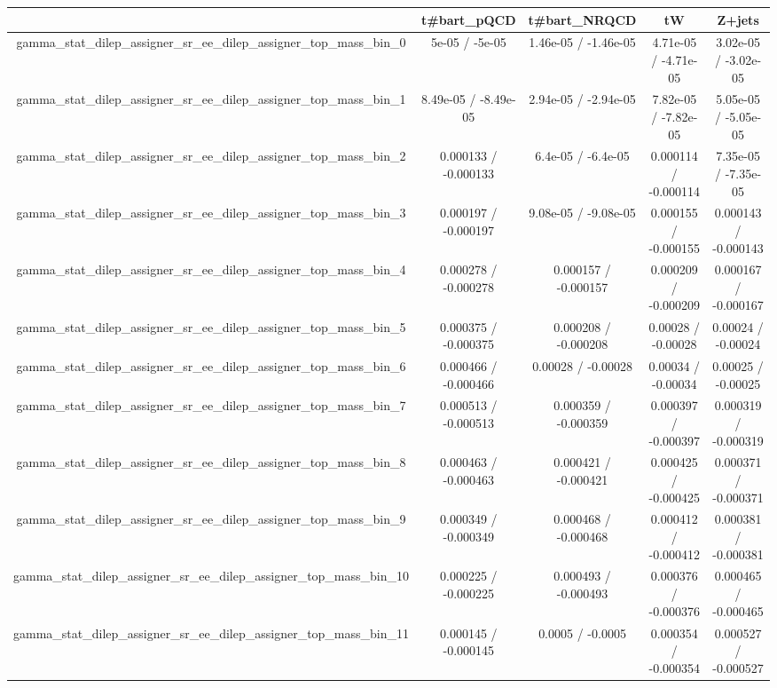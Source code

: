 \documentclass[10pt]{article}
\begin{document}
\begin{table}[htbp]
\begin{center}
\begin{tabular}{|c|c|c|c|c|}
\hline 
      & t#bar{t}_{pQCD}      & t#bar{t}_{NRQCD}      & tW      & Z+jets \\ 
\hline 
  gamma_stat_dilep_assigner_sr_ee_dilep_assigner_top_mass_bin_0 & 5e-05 / -5e-05 & 1.46e-05 / -1.46e-05 & 4.71e-05 / -4.71e-05 & 3.02e-05 / -3.02e-05 \\ 
  gamma_stat_dilep_assigner_sr_ee_dilep_assigner_top_mass_bin_1 & 8.49e-05 / -8.49e-05 & 2.94e-05 / -2.94e-05 & 7.82e-05 / -7.82e-05 & 5.05e-05 / -5.05e-05 \\ 
  gamma_stat_dilep_assigner_sr_ee_dilep_assigner_top_mass_bin_2 & 0.000133 / -0.000133 & 6.4e-05 / -6.4e-05 & 0.000114 / -0.000114 & 7.35e-05 / -7.35e-05 \\ 
  gamma_stat_dilep_assigner_sr_ee_dilep_assigner_top_mass_bin_3 & 0.000197 / -0.000197 & 9.08e-05 / -9.08e-05 & 0.000155 / -0.000155 & 0.000143 / -0.000143 \\ 
  gamma_stat_dilep_assigner_sr_ee_dilep_assigner_top_mass_bin_4 & 0.000278 / -0.000278 & 0.000157 / -0.000157 & 0.000209 / -0.000209 & 0.000167 / -0.000167 \\ 
  gamma_stat_dilep_assigner_sr_ee_dilep_assigner_top_mass_bin_5 & 0.000375 / -0.000375 & 0.000208 / -0.000208 & 0.00028 / -0.00028 & 0.00024 / -0.00024 \\ 
  gamma_stat_dilep_assigner_sr_ee_dilep_assigner_top_mass_bin_6 & 0.000466 / -0.000466 & 0.00028 / -0.00028 & 0.00034 / -0.00034 & 0.00025 / -0.00025 \\ 
  gamma_stat_dilep_assigner_sr_ee_dilep_assigner_top_mass_bin_7 & 0.000513 / -0.000513 & 0.000359 / -0.000359 & 0.000397 / -0.000397 & 0.000319 / -0.000319 \\ 
  gamma_stat_dilep_assigner_sr_ee_dilep_assigner_top_mass_bin_8 & 0.000463 / -0.000463 & 0.000421 / -0.000421 & 0.000425 / -0.000425 & 0.000371 / -0.000371 \\ 
  gamma_stat_dilep_assigner_sr_ee_dilep_assigner_top_mass_bin_9 & 0.000349 / -0.000349 & 0.000468 / -0.000468 & 0.000412 / -0.000412 & 0.000381 / -0.000381 \\ 
  gamma_stat_dilep_assigner_sr_ee_dilep_assigner_top_mass_bin_10 & 0.000225 / -0.000225 & 0.000493 / -0.000493 & 0.000376 / -0.000376 & 0.000465 / -0.000465 \\ 
  gamma_stat_dilep_assigner_sr_ee_dilep_assigner_top_mass_bin_11 & 0.000145 / -0.000145 & 0.0005 / -0.0005 & 0.000354 / -0.000354 & 0.000527 / -0.000527 \\ 

\end{tabular}
\end{center}
\end{table}
\end{document}
